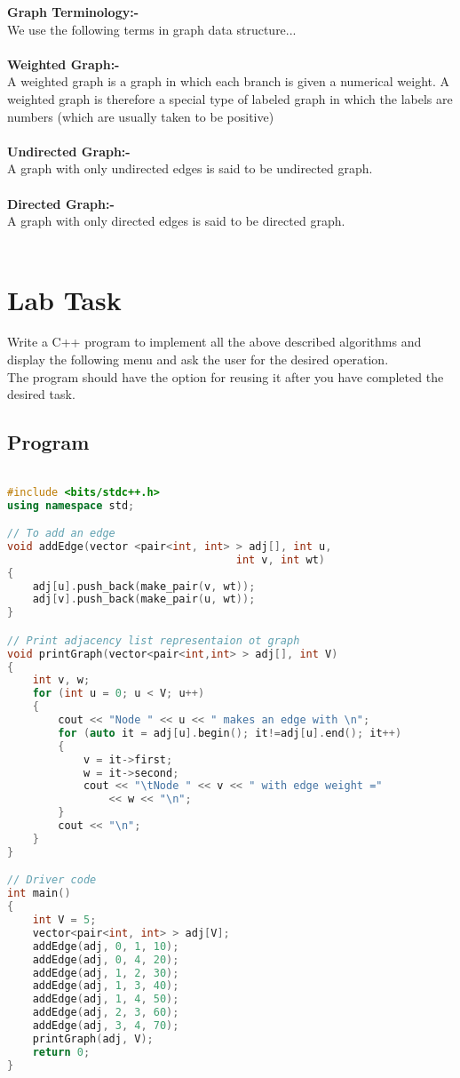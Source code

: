\documentclass[11pt]{article}            %
\begin{document}
\textbf{Graph Terminology:- }\\
We use the following terms in graph data structure...\\ \\

\textbf{Weighted Graph:-}\\
A weighted graph is a graph in which each branch is given a numerical weight. A weighted graph is therefore a special type of labeled graph in which the labels are numbers (which are usually taken to be positive)
\\ \\


\textbf{Undirected Graph:-}\\
A graph with only undirected edges is said to be undirected graph.
\\ \\

\textbf{Directed Graph:-}\\
A graph with only directed edges is said to be directed graph.
\\ \\

\section{Lab Task }  
Write a C++ program to implement all the above described algorithms and display the following menu and ask the user for the desired operation.\\    The program should have the option for reusing it after you have completed the desired task.

\subsection{Program}     

\begin{lstlisting}[language=c++]

#include <bits/stdc++.h>
using namespace std;

// To add an edge
void addEdge(vector <pair<int, int> > adj[], int u,
									int v, int wt)
{
	adj[u].push_back(make_pair(v, wt));
	adj[v].push_back(make_pair(u, wt));
}

// Print adjacency list representaion ot graph
void printGraph(vector<pair<int,int> > adj[], int V)
{
	int v, w;
	for (int u = 0; u < V; u++)
	{
		cout << "Node " << u << " makes an edge with \n";
		for (auto it = adj[u].begin(); it!=adj[u].end(); it++)
		{
			v = it->first;
			w = it->second;
			cout << "\tNode " << v << " with edge weight ="
				<< w << "\n";
		}
		cout << "\n";
	}
}

// Driver code
int main()
{
	int V = 5;
	vector<pair<int, int> > adj[V];
	addEdge(adj, 0, 1, 10);
	addEdge(adj, 0, 4, 20);
	addEdge(adj, 1, 2, 30);
	addEdge(adj, 1, 3, 40);
	addEdge(adj, 1, 4, 50);
	addEdge(adj, 2, 3, 60);
	addEdge(adj, 3, 4, 70);
	printGraph(adj, V);
	return 0;
}


\end{lstlisting}
\end{document}
